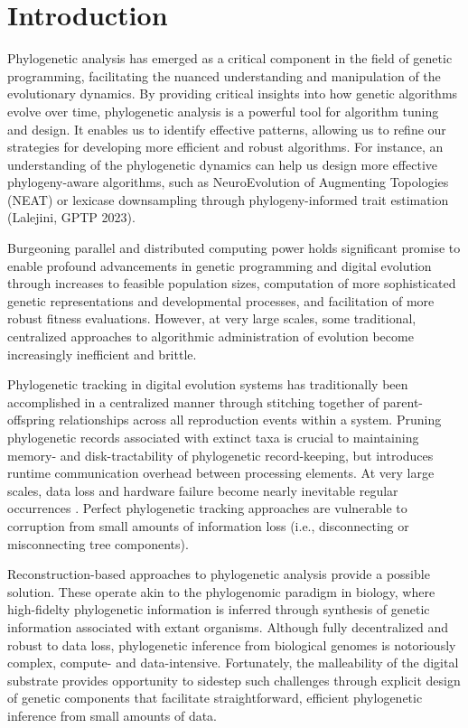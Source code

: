 \section{Introduction} \label{sec:introduction}

Phylogenetic analysis has emerged as a critical component in the field of genetic programming, facilitating the nuanced understanding and manipulation of the evolutionary dynamics.
By providing critical insights into how genetic algorithms evolve over time, phylogenetic analysis is a powerful tool for algorithm tuning and design.
It enables us to identify effective patterns, allowing us to refine our strategies for developing more efficient and robust algorithms.
For instance, an understanding of the phylogenetic dynamics can help us design more effective phylogeny-aware algorithms, such as NeuroEvolution of Augmenting Topologies (NEAT) \citep{stanley2002evolving} or lexicase downsampling through phylogeny-informed trait estimation (Lalejini, GPTP 2023). %

Burgeoning parallel and distributed computing power holds significant promise to enable profound advancements in genetic programming and digital evolution through increases to feasible population sizes, computation of more sophisticated genetic representations and developmental processes, and facilitation of more robust fitness evaluations.
However, at very large scales, some traditional, centralized approaches to algorithmic administration of evolution become increasingly inefficient and brittle.

Phylogenetic tracking in digital evolution systems has traditionally been accomplished in a centralized manner through stitching together of parent-offspring relationships across all reproduction events within a system.
Pruning phylogenetic records associated with extinct taxa is crucial to maintaining memory- and disk-tractability of phylogenetic record-keeping, but introduces runtime communication overhead between processing elements.
At very large scales, data loss and hardware failure become nearly inevitable regular occurrences \citep{gropp2013programming}.
Perfect phylogenetic tracking approaches are vulnerable to corruption from small amounts of information loss (i.e., disconnecting or misconnecting tree components).

Reconstruction-based approaches to phylogenetic analysis provide a possible solution.
These operate akin to the phylogenomic paradigm in biology, where high-fidelty phylogenetic information is inferred through synthesis of genetic information associated with extant organisms.
Although fully decentralized and robust to data loss, phylogenetic inference from biological genomes is notoriously complex, compute- and  data-intensive.
Fortunately, the malleability of the digital substrate provides opportunity to sidestep such challenges through explicit design of genetic components that facilitate straightforward, efficient phylogenetic inference from small amounts of data.

